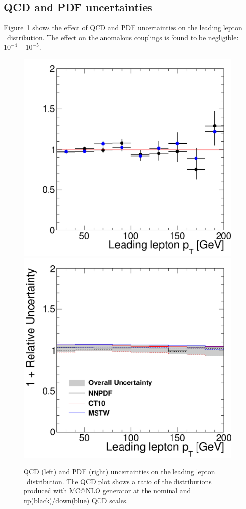 \subsection{QCD and PDF uncertainties}
Figure~\ref{fig:qcd_pdf} shows the effect of QCD and PDF uncertainties on
the leading lepton \pt\ distribution. The effect on the anomalous
couplings is found to be negligible: $10^{-4}-10^{-5}$.

\begin{figure}[tp]
  \centering
    \includegraphics[width=.45\textwidth]{figures/qqww_qcd_uncertainties.pdf}
    \includegraphics[width=.45\textwidth]{figures/qqww_pdf_uncertainties.pdf}

  \caption[QCD and PDF uncertianties]{QCD (left) and PDF (right)
  uncertainties on the leading lepton \pt\ distribution. The QCD plot
  shows a ratio of the distributions produced with MC@NLO
  generator at the nominal and up(black)/down(blue) QCD scales.} \label{fig:qcd_pdf}
\end{figure}
